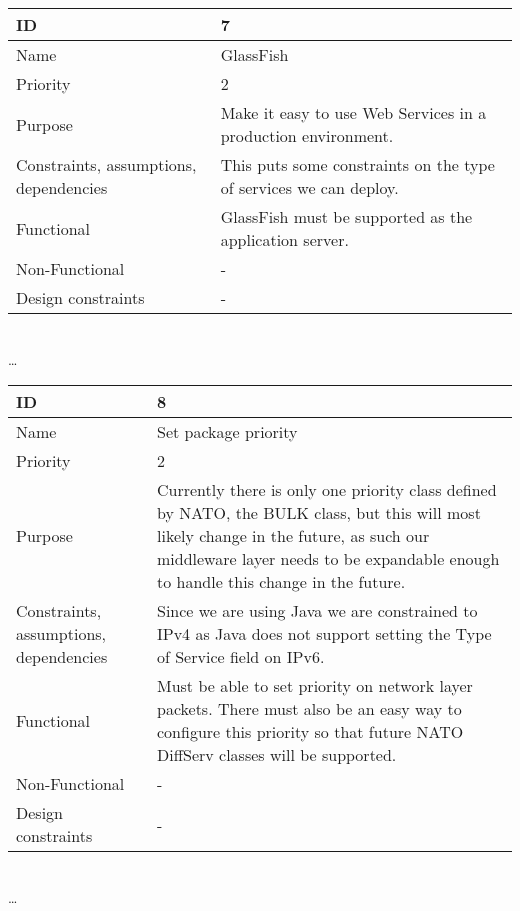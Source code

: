 \begin{center}
	\begin{tabular}{| p{4cm} | p{8cm} |}
		\hline
		ID & 7 \\
		\hline
		Name & GlassFish \\
		\hline
		Priority & 2 \\
		\hline
		Purpose & Make it easy to use Web Services in a production environment. \\
		\hline 
		Constraints, assumptions, dependencies & This puts some constraints on the type of services we can deploy. \\
		\hline  
		Functional & GlassFish must be supported as the application server.  \\
		\hline
		Non-Functional & - \\ 
		\hline
		Design constraints & - \\
		\hline
	\end{tabular}
	\\  \ldots  \\

	\begin{tabular}{| p{4cm} | p{8cm} |}
		\hline
		ID & 8 \\
		\hline
		Name & Set package priority \\
		\hline
		Priority & 2 \\
		\hline
		Purpose & Currently there is only one priority class defined by NATO, the BULK class, but this will most likely change in the future, as such our middleware layer needs to be expandable enough to handle this change in the future. \\
		\hline 
		Constraints, assumptions, dependencies & Since we are using Java we are constrained to IPv4 as Java does not support setting the Type of Service field on IPv6.\\
		\hline  
		Functional & Must be able to set priority on network layer packets. There must also be an easy way to configure this priority so that future NATO DiffServ classes will be supported. \\
		\hline
		Non-Functional & -\\ 
		\hline
		Design constraints & - \\
		\hline
	\end{tabular}
	\\  \ldots  \\


\end{center}
